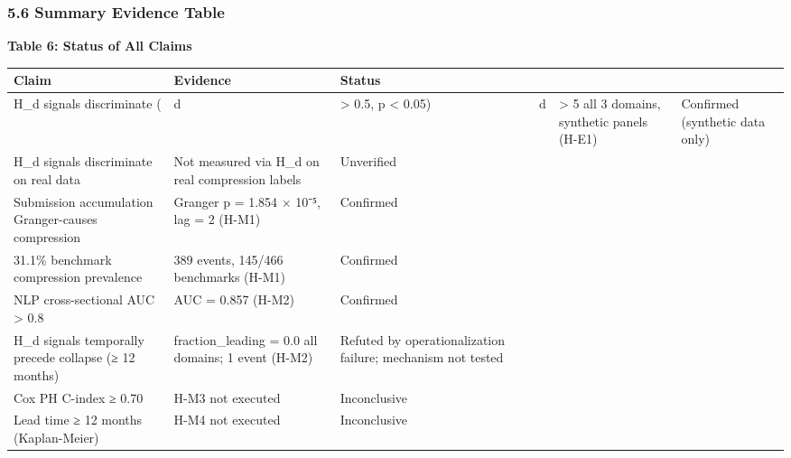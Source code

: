 \subsubsection{5.6 Summary Evidence Table}

\textbf{Table 6: Status of All Claims}

\begin{table}[htbp]
\centering
\begin{tabular}{lllllll}
\toprule
Claim & Evidence & Status &  &  &  &  \\
\midrule
H_d signals discriminate ( & d & > 0.5, p < 0.05) &  & d & > 5 all 3 domains, synthetic panels (H-E1) & Confirmed (synthetic data only) \\
H_d signals discriminate on real data & Not measured via H_d on real compression labels & Unverified &  &  &  &  \\
Submission accumulation Granger-causes compression & Granger p = 1.854 × 10⁻⁵, lag = 2 (H-M1) & Confirmed &  &  &  &  \\
31.1\% benchmark compression prevalence & 389 events, 145/466 benchmarks (H-M1) & Confirmed &  &  &  &  \\
NLP cross-sectional AUC > 0.8 & AUC = 0.857 (H-M2) & Confirmed &  &  &  &  \\
H_d signals temporally precede collapse (≥ 12 months) & fraction_leading = 0.0 all domains; 1 event (H-M2) & Refuted by operationalization failure; mechanism not tested &  &  &  &  \\
Cox PH C-index ≥ 0.70 & H-M3 not executed & Inconclusive &  &  &  &  \\
Lead time ≥ 12 months (Kaplan-Meier) & H-M4 not executed & Inconclusive &  &  &  &  \\
\bottomrule
\end{tabular}
\end{table}

